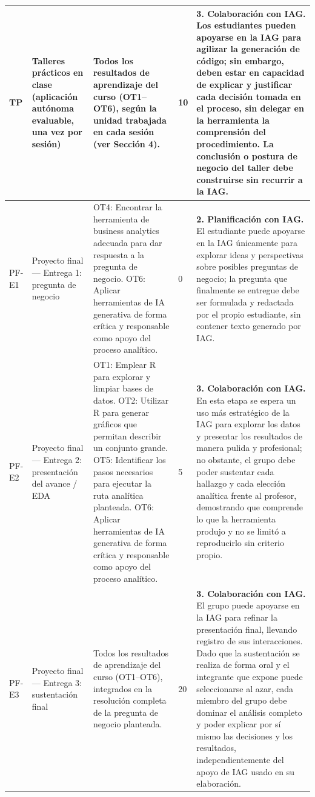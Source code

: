 \documentclass[11pt,a4paper]{article}
\begin{document}
\begin{center}
\begin{longtable}{|p{1.6cm}|p{2.6cm}|p{5.2cm}|p{0.8cm}|p{5.4cm}|}
TP & Talleres prácticos en clase (aplicación autónoma evaluable, una vez por sesión) &
Todos los resultados de aprendizaje del curso (OT1--OT6), según la unidad trabajada en cada sesión (ver Sección 4). &
10 &
\textbf{3. Colaboración con IAG.} Los estudiantes pueden apoyarse en la IAG para agilizar la generación de código; sin embargo, deben estar en capacidad de explicar y justificar cada decisión tomada en el proceso, sin delegar en la herramienta la comprensión del procedimiento. La conclusión o postura de negocio del taller debe construirse sin recurrir a la IAG. \\
\hline

PF-E1 & Proyecto final --- Entrega 1: pregunta de negocio &
OT4: Encontrar la herramienta de business analytics adecuada para dar respuesta a la pregunta de negocio. OT6: Aplicar herramientas de IA generativa de forma crítica y responsable como apoyo del proceso analítico. &
0 &
\textbf{2. Planificación con IAG.} El estudiante puede apoyarse en la IAG únicamente para explorar ideas y perspectivas sobre posibles preguntas de negocio; la pregunta que finalmente se entregue debe ser formulada y redactada por el propio estudiante, sin contener texto generado por IAG. \\
\hline

PF-E2 & Proyecto final --- Entrega 2: presentación del avance / EDA &
OT1: Emplear R para explorar y limpiar bases de datos. OT2: Utilizar R para generar gráficos que permitan describir un conjunto grande. OT5: Identificar los pasos necesarios para ejecutar la ruta analítica planteada. OT6: Aplicar herramientas de IA generativa de forma crítica y responsable como apoyo del proceso analítico. &
5 &
\textbf{3. Colaboración con IAG.} En esta etapa se espera un uso más estratégico de la IAG para explorar los datos y presentar los resultados de manera pulida y profesional; no obstante, el grupo debe poder sustentar cada hallazgo y cada elección analítica frente al profesor, demostrando que comprende lo que la herramienta produjo y no se limitó a reproducirlo sin criterio propio. \\
\hline

PF-E3 & Proyecto final --- Entrega 3: sustentación final &
Todos los resultados de aprendizaje del curso (OT1--OT6), integrados en la resolución completa de la pregunta de negocio planteada. &
20 &
\textbf{3. Colaboración con IAG.} El grupo puede apoyarse en la IAG para refinar la presentación final, llevando registro de sus interacciones. Dado que la sustentación se realiza de forma oral y el integrante que expone puede seleccionarse al azar, cada miembro del grupo debe dominar el análisis completo y poder explicar por sí mismo las decisiones y los resultados, independientemente del apoyo de IAG usado en su elaboración. \\
\hline
\end{longtable}
\end{center}
\end{document}
